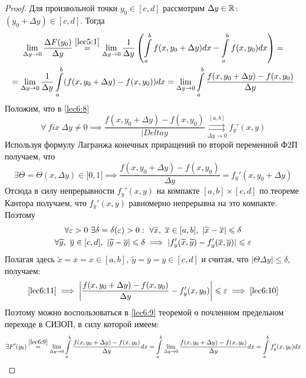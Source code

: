 \documentclass[../../main.tex]{subfiles}
\begin{document}
\begin{proof}
	Для произвольной точки $ y_0 \in [c, d] $ рассмотрим $ \Delta y \in \mathbb{R} $:
	$ (y_0 + \Delta y) \in [c, d] $. Тогда 
	\begin{equation}
	\begin{gathered}
		\lim\limits_{\Delta y \to 0} \dfrac{\Delta F(y_0)}{\Delta y} 
		\stackrel{\eqref{lec5:1}}{=} \lim\limits_{\Delta y \to 0}
		\dfrac{1}{\Delta y} \left(
		\int\limits_a^b f(x, y_0 + \Delta y) dx - \int\limits_a^b f(x, y_0) dx
		\right) = \\
		\label{lec6:9} =
		\lim\limits_{\Delta y \to 0} \dfrac{1}{\Delta y}
		\int\limits_a^b (f(x, y_0 + \Delta y) - f(x, y_0)) dx = 
		\lim\limits_{\Delta y \to 0}\int\limits_a^b
		\dfrac{f(x, y_0 + \Delta y) - f(x, y_0)}{\Delta y}
	\end{gathered}
	\end{equation}
	Положим, что в \eqref{lec6:8} 
	\begin{equation}
	\label{lec6:10} 
	\forall\ fix \ \Delta y \neq 0 \implies
	\dfrac{f(x, y_0 + \Delta y) - f(x, y_0)}{|Delta y} 
	\stackrel{[a, b]}{\underset{\Delta y \to 0}{\rightrightarrows}} f_y'(x, y)
	\end{equation}
	Используя формулу Лагранжа конечных приращений по второй переменной 
	Ф2П получаем, что 
	\[ 
	\exists \Theta = \Theta(x, \Delta y) \in ]0, 1[ 
	\implies \dfrac{f(x, y_0 + \Delta y) - f(x, y_0)}{\Delta y} = 
	f_y'(x, y_0 + \Delta y)
	\]
	Отсюда в силу непрерывности $ f_y'(x, y) $ на компакте $ [a, b] \times 
	[c, d] $ по теореме Кантора получаем, что $ f_y'(x, y) $ равномерно
	непрерывна на это компакте. Поэтому
	\begin{equation}
		\begin{gathered}
		\forall \eps > 0 \ \exists \delta = \delta(\eps) > 0: \ 
		\forall \widetilde{x},\ \overline{x} \in [a, b],\ 
		|\widetilde{x} - \overline{x}| \leq \delta \\
		\label{lec6:11}
		\forall \widetilde{y},\ \overline{y} \in [c, d],\
		|\widetilde{y} - \overline{y}| \leq \delta \implies
		|f_y'(\widetilde{x}, \widetilde{y}) - f_y'(\overline{x}, \overline{y})|
		\leq \eps
		\end{gathered}
	\end{equation}
	Полагая здесь $ \widetilde{x} = \overline{x} = x \in [a, b],\ 
	\widetilde{y} = \overline{y} = y \in [c, d]	$ и считая, что 
	$ |\Theta\Delta y| \leq \delta $, получаем:
	\[
	\eqref{lec6:11} \implies\left|
	\dfrac{f(x, y_0 + \Delta y) - f(x, y_0)}{\Delta y} - f_y'(x, y_0)
	\right| \leqslant \varepsilon \implies \eqref{lec6:10}
	\]
	Поэтому можно воспользоваться в \eqref{lec6:9} теоремой о почленном 
	предельном переходе в СИЗОП, в силу которой имеем:
	\[
	\exists F'(y_0) \stackrel{\eqref{lec6:9}}{=} \lim\limits_{\Delta y \to 0}
	\int\limits_a^b \dfrac{f(x, y_0 + \Delta y) - f(x, y_0)}{\Delta y} dx =
	\int\limits_a^b \lim\limits_{\Delta y \to 0} 
	\dfrac{f(x, y_0 + \Delta y) - f(x, y_0)}{\Delta y} dx = 
	\int\limits_a^b f_y'(x, y_0) dx	
	\]
\end{proof}
\end{document}
